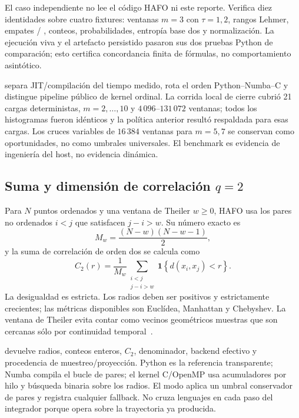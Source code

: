 El caso independiente
 no lee el código
HAFO ni este reporte. Verifica diez identidades sobre cuatro fixtures: ventanas
$m=3$ con $\tau=1,2$, rangos Lehmer, empates /
, conteos, probabilidades, entropía base dos y normalización.
La ejecución viva y el artefacto persistido pasaron sus dos pruebas Python de
comparación; esto certifica concordancia finita de fórmulas, no comportamiento
asintótico.

 separa JIT/compilación del
tiempo medido, rota el orden Python--Numba--C y distingue pipeline público de
kernel ordinal. La corrida local de cierre cubrió 21 cargas deterministas,
$m=2,\ldots,10$ y $4\,096$--$131\,072$ ventanas; todos los histogramas fueron
idénticos y la política anterior resultó respaldada para esas cargas. Los
cruces variables de $16\,384$ ventanas para $m=5,7$ se conservan como
oportunidades, no como umbrales universales. El benchmark es evidencia de
ingeniería del host, no evidencia dinámica.

\subsection{Suma y dimensión de correlación \texorpdfstring{\(q=2\)}{q=2}}
\label{sec:correlation-dimension-q2}

Para $N$ puntos ordenados y una ventana de Theiler $w\geq0$, HAFO usa los
pares no ordenados $i<j$ que satisfacen $j-i>w$. Su número exacto es
\[
 M_w=\frac{(N-w)(N-w-1)}{2},
\]
y la suma de correlación de orden dos se calcula como
\[
 C_2(r)=\frac{1}{M_w}
 \sum_{\substack{i<j\\j-i>w}}
 \mathbf 1\!\left\{d(x_i,x_j)<r\right\}.
\]
La desigualdad es estricta. Los radios deben ser positivos y estrictamente
crecientes; las métricas disponibles son Euclídea, Manhattan y Chebyshev. La
ventana de Theiler evita contar como vecinos geométricos muestras que son
cercanas sólo por continuidad temporal~\cite{GrassbergerProcaccia1983,
GrassbergerProcaccia1983Measuring,Theiler1986}.

 devuelve radios, conteos enteros, $C_2$,
denominador, backend efectivo y procedencia de muestreo/proyección. Python es
la referencia transparente; Numba compila el bucle de pares; el kernel
C/OpenMP usa acumuladores por hilo y búsqueda binaria sobre los radios. El
modo  aplica un umbral conservador de pares y registra cualquier
fallback. No cruza lenguajes en cada paso del integrador porque opera sobre la
trayectoria ya producida.

